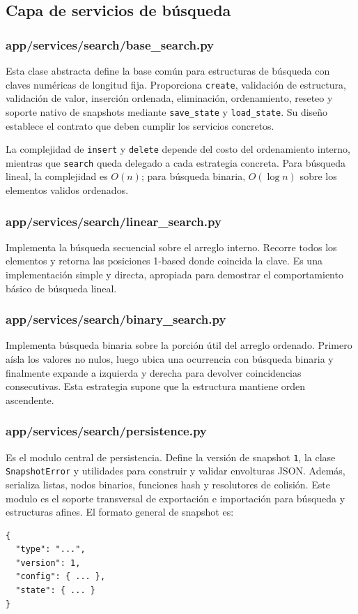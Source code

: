 \documentclass[12pt,onecolumn]{IEEEtran}
\begin{document}
\subsection{Capa de servicios de búsqueda}
\subsubsection{app/services/search/base\_search.py}
Esta clase abstracta define la base común para estructuras de búsqueda con claves numéricas de longitud fija. Proporciona \texttt{create}, validación de estructura, validación de valor, inserción ordenada, eliminación, ordenamiento, reseteo y soporte nativo de snapshots mediante \texttt{save\_state} y \texttt{load\_state}. Su diseño establece el contrato que deben cumplir los servicios concretos.

La complejidad de \texttt{insert} y \texttt{delete} depende del costo del ordenamiento interno, mientras que \texttt{search} queda delegado a cada estrategia concreta. Para búsqueda lineal, la complejidad es $O(n)$; para búsqueda binaria, $O(\log n)$ sobre los elementos validos ordenados.

\subsubsection{app/services/search/linear\_search.py}
Implementa la búsqueda secuencial sobre el arreglo interno. Recorre todos los elementos y retorna las posiciones 1-based donde coincida la clave. Es una implementación simple y directa, apropiada para demostrar el comportamiento básico de búsqueda lineal.

\subsubsection{app/services/search/binary\_search.py}
Implementa búsqueda binaria sobre la porción útil del arreglo ordenado. Primero aísla los valores no nulos, luego ubica una ocurrencia con búsqueda binaria y finalmente expande a izquierda y derecha para devolver coincidencias consecutivas. Esta estrategia supone que la estructura mantiene orden ascendente.

\subsubsection{app/services/search/persistence.py}
Es el modulo central de persistencia. Define la versión de snapshot \texttt{1}, la clase \texttt{SnapshotError} y utilidades para construir y validar envolturas JSON. Además, serializa listas, nodos binarios, funciones hash y resolutores de colisión. Este modulo es el soporte transversal de exportación e importación para búsqueda y estructuras afines.
El formato general de snapshot es:
\begin{lstlisting}[style=cs2json,caption={Estructura canónica de snapshot},label={lst:snapshot-envelope}]
{
  "type": "...",
  "version": 1,
  "config": { ... },
  "state": { ... }
}
\end{lstlisting}
\end{document}
